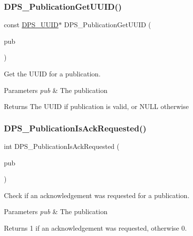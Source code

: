 \subsubsection{\texorpdfstring{D\+P\+S\+\_\+\+Publication\+Get\+U\+U\+I\+D()}{DPS\_PublicationGetUUID()}}
{\footnotesize\ttfamily const \hyperlink{group__uuid_gaef1d03afcc6410602ade1d48f24c3997}{D\+P\+S\+\_\+\+U\+U\+ID}$\ast$ D\+P\+S\+\_\+\+Publication\+Get\+U\+U\+ID (\begin{DoxyParamCaption}\item[{const \hyperlink{group__publication_ga0d439693474aa54e27f3d45a054696ac}{D\+P\+S\+\_\+\+Publication} $\ast$}]{pub }\end{DoxyParamCaption})}



Get the U\+U\+ID for a publication. 


\begin{DoxyParams}{Parameters}
{\em pub} & The publication\\
\hline
\end{DoxyParams}
\begin{DoxyReturn}{Returns}
The U\+U\+ID if publication is valid, or N\+U\+LL otherwise 
\end{DoxyReturn}
\mbox{\label{group__publication_ga516f7f314c7b95210751d00285758b9b}} 
\subsubsection{\texorpdfstring{D\+P\+S\+\_\+\+Publication\+Is\+Ack\+Requested()}{DPS\_PublicationIsAckRequested()}}
{\footnotesize\ttfamily int D\+P\+S\+\_\+\+Publication\+Is\+Ack\+Requested (\begin{DoxyParamCaption}\item[{const \hyperlink{group__publication_ga0d439693474aa54e27f3d45a054696ac}{D\+P\+S\+\_\+\+Publication} $\ast$}]{pub }\end{DoxyParamCaption})}



Check if an acknowledgement was requested for a publication. 


\begin{DoxyParams}{Parameters}
{\em pub} & The publication\\
\hline
\end{DoxyParams}
\begin{DoxyReturn}{Returns}
1 if an acknowledgement was requested, otherwise 0. 
\end{DoxyReturn}
\mbox{\label{group__publication_gaa5225be2733d6ebfd01f9475e3fc06f5}} 
